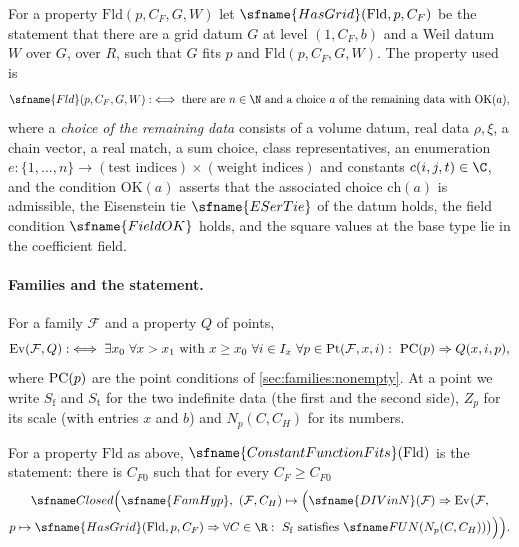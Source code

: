 For a property $\mathrm{Fld}(p,C_F,G,W)$ let $\sfname{HasGrid}(\mathrm{Fld},p,C_F)$ be the statement that there are a grid
datum $G$ at level $(1,C_F,b)$ and a Weil datum $W$ over $G$, over $R$, such that $G$ fits $p$ and
$\mathrm{Fld}(p,C_F,G,W)$. The property used is
\[
\sfname{Fld}(p,C_F,G,W):\iff\text{there are }n\in\N\text{ and a choice }a\text{ of the remaining data with }\mathrm{OK}(a),
\]
where a \emph{choice of the remaining data} consists of a volume datum, real data $\rho,\xi$, a chain vector, a
real match, a sum choice, class representatives, an enumeration $e\colon\{1,\dots,n\}\to(\text{test indices})\times
(\text{weight indices})$ and constants $c(i,j,t)\in\C$, and the condition $\mathrm{OK}(a)$ asserts that the associated choice
$\mathrm{ch}(a)$ is admissible, the Eisenstein tie $\sfname{ESerTie}$ of the datum holds, the field condition
$\sfname{FieldOK}$ holds, and the square values at the base type lie in the coefficient field.

\paragraph{Families and the statement.}
For a family $\mathcal F$ and a property $Q$ of points,
\[
\mathrm{Ev}(\mathcal F,Q):\iff\exists x_0\ \forall x>x_1\text{ with }x\ge x_0\ \forall i\in I_x\
\forall p\in\mathrm{Pt}(\mathcal F,x,i):\ \mathrm{PC}(p)\Rightarrow Q(x,i,p),
\]
where $\mathrm{PC}(p)$ are the point conditions of \cref{sec:families:nonempty}. At a point we write $S_{\mathrm f}$ and
$S_{\mathrm t}$ for the two indefinite data (the first and the second side), $Z_p$ for its scale (with entries $x$ and
$b$) and $N_p(C,C_H)$ for its numbers.

\begin{definition}\label{pf:fit:defCFF}
For a property $\mathrm{Fld}$ as above, $\sfname{ConstantFunctionFits}(\mathrm{Fld})$ is the statement: there is
$C_{F0}$ such that for every $C_F\ge C_{F0}$
\begin{multline*}
\fitClosed\Bigl(\sfname{FamHyp},\ (\mathcal F,C_H)\mapsto\Bigl(\sfname{DIVinN}(\mathcal F)\Rightarrow\fitEv\bigl(\mathcal F,\\
p\mapsto\sfname{HasGrid}(\mathrm{Fld},p,C_F)\Rightarrow\forall C\in\R:\ S_{\mathrm f}\text{ satisfies }
\fitFUN(N_p(C,C_H))\bigr)\Bigr)\Bigr).
\end{multline*}
\end{definition}


